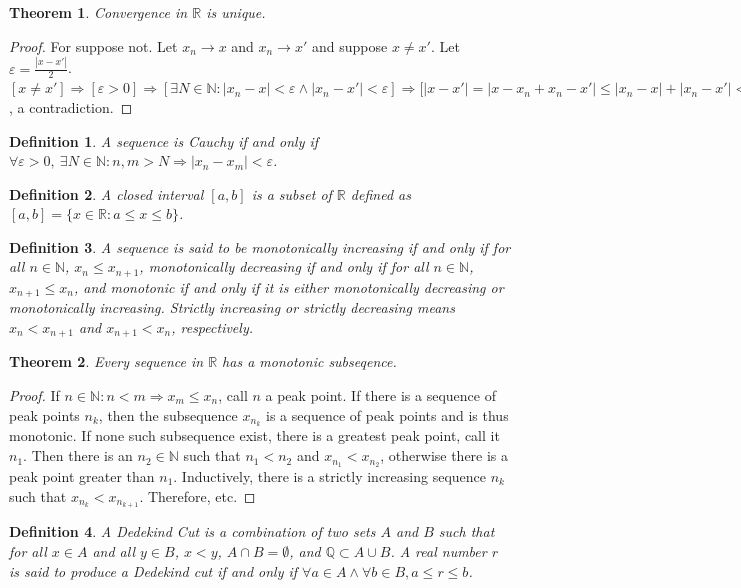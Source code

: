 \documentclass[12pt,oneside]{book}
\theoremstyle{mystyle}
\newtheorem{theorem}{Theorem}[section]
\newtheorem{definition}{Definition}[section]
\begin{document}
\begin{theorem}
Convergence in $\mathbb{R}$ is unique.
\end{theorem}
\begin{proof}
For suppose not. Let $x_n \rightarrow x$ and $x_n \rightarrow x'$ and suppose $x\ne x'$. Let $\varepsilon = \frac{|x-x'|}{2}$. $[x\ne x']\Rightarrow [\varepsilon>0]\Rightarrow [\exists N\in\mathbb{N}:|x_n-x|<\varepsilon\land |x_n-x'| <\varepsilon]\Rightarrow \big[|x-x'|=|x-x_n+x_n-x'|\leq |x_n-x|+|x_n-x'|<2\varepsilon = |x-x'|\big]$, a contradiction.
\end{proof}

\begin{definition}
A sequence is Cauchy if and only if $\forall \varepsilon>0,\ \exists N\in \mathbb{N}: n,m>N\Rightarrow |x_n-x_m|<\varepsilon$.
\end{definition}

\begin{definition}
A closed interval $[a,b]$ is a subset of $\mathbb{R}$ defined as $[a,b] = \{x\in\mathbb{R}:a\leq x\leq b\}$. 
\end{definition}

\begin{definition}
A sequence is said to be monotonically increasing if and only if for all $n\in \mathbb{N}$, $x_n \leq x_{n+1}$, monotonically decreasing if and only if for all $n\in \mathbb{N}$, $x_{n+1} \leq x_{n}$, and monotonic if and only if it is either monotonically decreasing or monotonically increasing. Strictly increasing or strictly decreasing means $x_{n}<x_{n+1}$ and $x_{n+1}<x_n$, respectively.
\end{definition}

\begin{theorem}
Every sequence in $\mathbb{R}$ has a monotonic subseqence.
\end{theorem}
\begin{proof}
If $n\in \mathbb{N}:n<m\Rightarrow x_m \leq x_n$, call $n$ a peak point. If there is a sequence of peak points $n_k$, then the subsequence $x_{n_k}$ is a sequence of peak points and is thus monotonic. If none such subsequence exist, there is a greatest peak point, call it $n_1$. Then there is an $n_2\in \mathbb{N}$ such that $n_1 < n_2$ and $x_{n_1}< x_{n_2}$, otherwise there is a peak point greater than $n_1$. Inductively, there is a strictly increasing sequence $n_k$ such that $x_{n_k}< x_{n_{k+1}}$. Therefore, etc.
\end{proof}

\begin{definition}
A Dedekind Cut is a combination of two sets $A$ and $B$ such that for all $x\in A$ and all $y\in B$, $x< y$, $A\cap B=\emptyset$, and $\mathbb{Q} \subset A\cup B$. A real number $r$ is said to produce a Dedekind cut if and only if $\forall a\in A\land \forall b\in B, a\leq r\leq b$.
\end{definition}
\end{document}
